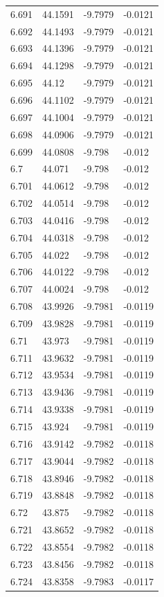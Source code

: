 \begin{tabular}{llll}
6.691 & 44.1591 & -9.7979 & -0.0121 \\
6.692 & 44.1493 & -9.7979 & -0.0121 \\
6.693 & 44.1396 & -9.7979 & -0.0121 \\
6.694 & 44.1298 & -9.7979 & -0.0121 \\
6.695 & 44.12 & -9.7979 & -0.0121 \\
6.696 & 44.1102 & -9.7979 & -0.0121 \\
6.697 & 44.1004 & -9.7979 & -0.0121 \\
6.698 & 44.0906 & -9.7979 & -0.0121 \\
6.699 & 44.0808 & -9.798 & -0.012 \\
6.7 & 44.071 & -9.798 & -0.012 \\
6.701 & 44.0612 & -9.798 & -0.012 \\
6.702 & 44.0514 & -9.798 & -0.012 \\
6.703 & 44.0416 & -9.798 & -0.012 \\
6.704 & 44.0318 & -9.798 & -0.012 \\
6.705 & 44.022 & -9.798 & -0.012 \\
6.706 & 44.0122 & -9.798 & -0.012 \\
6.707 & 44.0024 & -9.798 & -0.012 \\
6.708 & 43.9926 & -9.7981 & -0.0119 \\
6.709 & 43.9828 & -9.7981 & -0.0119 \\
6.71 & 43.973 & -9.7981 & -0.0119 \\
6.711 & 43.9632 & -9.7981 & -0.0119 \\
6.712 & 43.9534 & -9.7981 & -0.0119 \\
6.713 & 43.9436 & -9.7981 & -0.0119 \\
6.714 & 43.9338 & -9.7981 & -0.0119 \\
6.715 & 43.924 & -9.7981 & -0.0119 \\
6.716 & 43.9142 & -9.7982 & -0.0118 \\
6.717 & 43.9044 & -9.7982 & -0.0118 \\
6.718 & 43.8946 & -9.7982 & -0.0118 \\
6.719 & 43.8848 & -9.7982 & -0.0118 \\
6.72 & 43.875 & -9.7982 & -0.0118 \\
6.721 & 43.8652 & -9.7982 & -0.0118 \\
6.722 & 43.8554 & -9.7982 & -0.0118 \\
6.723 & 43.8456 & -9.7982 & -0.0118 \\
6.724 & 43.8358 & -9.7983 & -0.0117 \\

\end{tabular}
